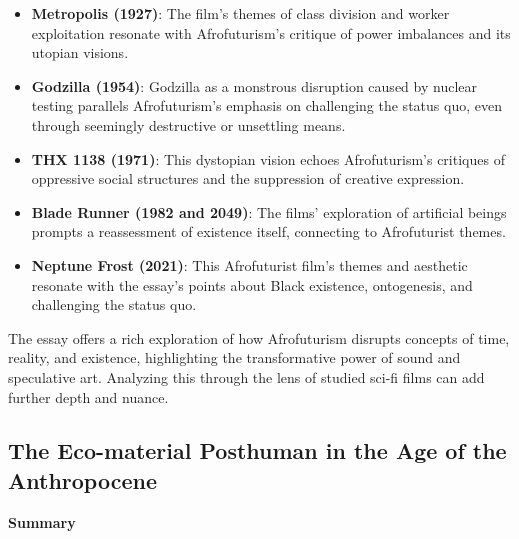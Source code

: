 \documentclass[11pt,fleqn]{book}
\begin{document}
\begin{itemize}
\item \textbf{Metropolis (1927)}:  The film's themes of class division and worker exploitation resonate with Afrofuturism's critique of power imbalances and its utopian visions. 

\item \textbf{Godzilla (1954)}:  Godzilla as a monstrous disruption caused by nuclear testing parallels Afrofuturism's emphasis on challenging the status quo, even through seemingly destructive or unsettling means.

\item \textbf{THX 1138 (1971)}: This dystopian vision echoes Afrofuturism's critiques of oppressive social structures and the suppression of creative expression.

\item \textbf{Blade Runner (1982 and 2049)}: The films' exploration of artificial beings prompts a reassessment of existence itself, connecting to Afrofuturist themes.

\item \textbf{Neptune Frost (2021)}: This Afrofuturist film's themes and aesthetic resonate with the essay's points about Black existence, ontogenesis, and challenging the status quo.
\end{itemize}

\vspace{5pt}

The essay offers a rich exploration of how Afrofuturism disrupts concepts of time, reality, and existence, highlighting the transformative power of sound and speculative art. Analyzing this through the lens of studied sci-fi films can add further depth and nuance. 



\subsection{The Eco-material Posthuman in the Age of the Anthropocene}
\textbf{Summary}
\end{document}
